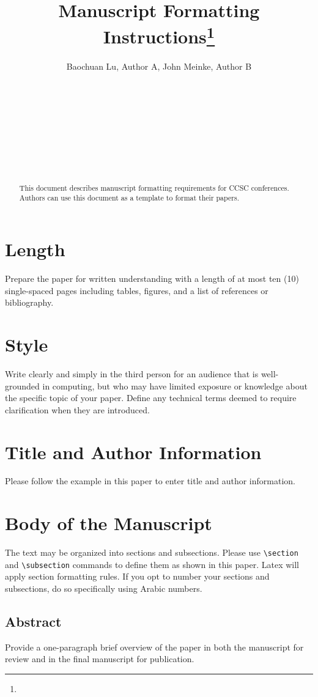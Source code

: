 \documentclass{article}
\title{Manuscript Formatting Instructions\footnote{\protect}
}
\author{
Baochuan Lu\affmark[1], Author A\affmark[1], John Meinke\affmark[2], Author B\affmark[2]\\
\affaddr{\affmark[1]Computer and Information Sciences}\\
\affaddr{Southwest Baptist University}\\
\affaddr{Bolivar, MO 65613}\\
\email{\{blu,author\}@sbuniv.edu}\\
\affaddr{\affmark[2]Computer Science Department}\\
\affaddr{Another University}\\
\affaddr{Our Town, TX 00000}\\
\email{\{jmeinke,author\}@univ.edu}\\
}
\begin{document}
\maketitle

\begin{abstract}
This document describes manuscript formatting requirements for CCSC conferences.
Authors can use this document as a template to format their papers.
\end{abstract}

\section{Length}
Prepare the paper for written understanding with a length of at most ten
(10) single-spaced pages including tables, figures, and a list of references or
bibliography.

\section{Style}
Write clearly and simply in the third person for an audience that is
well-grounded in computing, but who may have limited exposure or knowledge about
the specific topic of your paper. Define any technical terms deemed to require
clarification when they are introduced.

\section{Title and Author Information}
Please follow the example in this paper to enter title and author information.

\section{Body of the Manuscript}
The text may be organized into sections and subsections. Please use
\verb+\section+ and  \verb+\subsection+ commands to define them as shown in this
paper. Latex will apply section formatting rules. If you opt to number your
sections and subsections, do so specifically using Arabic numbers.

\subsection{Abstract}
Provide a one-paragraph brief overview of the paper in both the manuscript for
review and in the final manuscript for publication.
\end{document}
